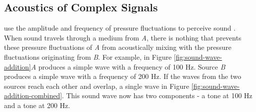 \DIFdelbegin %
\DIFdelend \DIFaddbegin \subsection{Acoustics of Complex Signals}
\DIFaddend 

\DIFdelbegin {}\DIFdelend \DIFaddbegin {}\DIFaddend use the amplitude and frequency of pressure fluctuations to perceive sound \DIFaddbegin {}\DIFaddend . When sound travels through a medium from \DIFdelbegin {}\DIFdelend \DIFaddbegin {}\DIFaddend \textit{A}, there is nothing that prevents these pressure fluctuations of \DIFdelbegin {}\DIFdelend \DIFaddbegin {}\DIFaddend \textit{A} from acoustically mixing with the pressure fluctuations originating from \DIFdelbegin {}\DIFdelend \DIFaddbegin {}\DIFaddend \textit{B}.  For example, in Figure \ref{fig:sound-wave-addition}\DIFdelbegin {}\DIFdelend \DIFaddbegin {}\DIFaddend \textit{A} produces a simple wave with a frequency of 100 Hz.  Source \textit{B} produces a simple wave with a frequency of 200 Hz.  If the waves from the two sources reach each other and overlap, a single wave \DIFdelbegin {}\DIFdelend \DIFaddbegin {}\DIFaddend in Figure \ref{fig:sound-wave-addition-combined}.  This sound wave now has two components - a tone at 100 Hz and a tone at 200 Hz.

